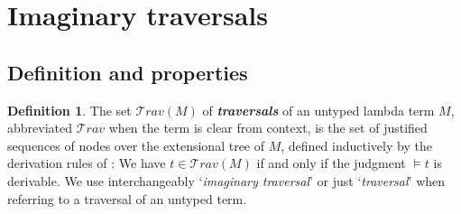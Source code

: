 \documentclass[xchauthor,chkrefs,GCNS,amsmath,amsthm,rotating,leaveRGB]{tcsg}
\renewcommand{\index}[1]{}
\theoremstyle{plain}
\theoremstyle{definition}
\newtheorem{definition}{Definition}[section]
\newcommand\travset{\mathcal{T}\!rav}
\newcommand{\travulc}{\travset}
\def\istraversal{\models}
\begin{document}
\section{Imaginary traversals}\label{sec:imaginary_traversals}

\subsection{Definition and properties}

\begin{definition}
The set $\travulc (M)$ of \textbf{\emph{traversals}}\index{traversals} of an
untyped lambda term $M$, abbreviated $\travulc $ when the term is clear from
context, is the set of justified sequences of nodes over the extensional tree
of $M$, defined inductively by the derivation rules of
: We have $t \in \travulc (M)$ if and
only if the judgment $\istraversal t$ is derivable. We use interchangeably
`\emph{imaginary traversal}' or just `\emph{traversal}' when referring to a
traversal of an untyped term.
\end{definition}
\end{document}
